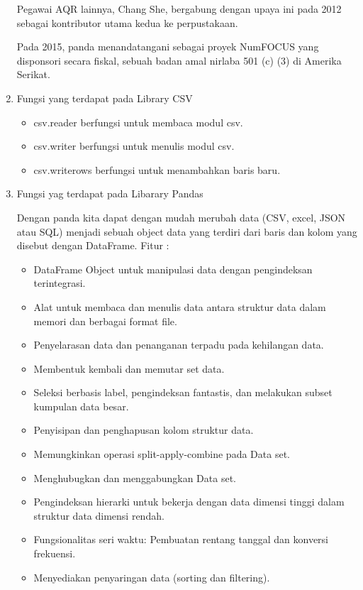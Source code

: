 \begin{enumerate}
Pegawai AQR lainnya, Chang She, bergabung dengan upaya ini pada 2012 sebagai kontributor utama kedua ke perpustakaan.

Pada 2015, panda menandatangani sebagai proyek NumFOCUS yang disponsori secara fiskal, sebuah badan amal nirlaba 501 (c) (3) di Amerika Serikat.

\item Fungsi yang terdapat pada Library CSV

\begin{itemize}
\item csv.reader berfungsi untuk membaca modul csv.
\item csv.writer berfungsi untuk menulis modul csv.
\item csv.writerows berfungsi untuk menambahkan baris baru.
\end{itemize}

\item Fungsi yag terdapat pada Libarary Pandas

Dengan panda kita dapat dengan mudah merubah data (CSV, excel, JSON atau SQL) menjadi sebuah object data yang terdiri dari baris dan kolom yang disebut dengan DataFrame.
Fitur :

\begin{itemize}

\item DataFrame Object untuk manipulasi data dengan pengindeksan terintegrasi.
\item Alat untuk membaca dan menulis data antara struktur data dalam memori dan berbagai format file.
\item Penyelarasan data dan penanganan terpadu pada kehilangan data.
\item Membentuk kembali dan memutar set data.
\item Seleksi berbasis label, pengindeksan fantastis, dan melakukan subset kumpulan data besar.
\item Penyisipan dan penghapusan kolom struktur data.
\item Memungkinkan operasi split-apply-combine pada Data set.
\item Menghubugkan dan menggabungkan Data set.
\item Pengindeksan hierarki untuk bekerja dengan data dimensi tinggi dalam struktur data dimensi rendah.
\item Fungsionalitas seri waktu: Pembuatan rentang tanggal dan konversi frekuensi.
\item Menyediakan penyaringan data (sorting dan filtering).
\end{itemize}


\end{enumerate}

